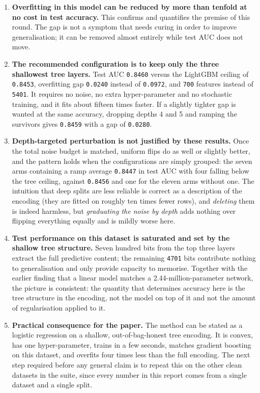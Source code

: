 \documentclass[11pt,a4paper]{article}
\newcommand{\num}[1]{\texttt{#1}}
\begin{document}
\begin{enumerate}

\item \textbf{Overfitting in this model can be reduced by more than tenfold at
no cost in test accuracy.} This confirms and quantifies the premise of this
round. The gap is not a symptom that needs curing in order to improve
generalisation; it can be removed almost entirely while test AUC does not move.

\item \textbf{The recommended configuration is to keep only the three
shallowest tree layers.} Test AUC \num{0.8460} versus the LightGBM ceiling of
\num{0.8453}, overfitting gap \num{0.0240} instead of \num{0.0972}, and
\num{700} features instead of \num{5401}. It requires no noise, no extra
hyper-parameter and no stochastic training, and it fits about fifteen times
faster. If a slightly tighter gap is wanted at the same accuracy, dropping
depths 4 and 5 and ramping the survivors gives \num{0.8459} with a gap of
\num{0.0280}.

\item \textbf{Depth-targeted perturbation is not justified by these results.}
Once the total noise budget is matched, uniform flips do as well or slightly
better, and the pattern holds when the configurations are simply grouped: the
seven arms containing a ramp average \num{0.8447} in test AUC with four falling
below the tree ceiling, against \num{0.8456} and one for the eleven arms
without one. The intuition that deep splits are less reliable is correct as a
description of the encoding (they are fitted on roughly ten times fewer rows),
and \emph{deleting} them is indeed harmless, but \emph{graduating the noise by
depth} adds nothing over flipping everything equally and is mildly worse here.

\item \textbf{Test performance on this dataset is saturated and set by the
shallow tree structure.} Seven hundred bits from the top three layers extract
the full predictive content; the remaining \num{4701} bits contribute nothing to
generalisation and only provide capacity to memorise. Together with the earlier
finding that a linear model matches a 2.44-million-parameter network, the
picture is consistent: the quantity that determines accuracy here is the tree
structure in the encoding, not the model on top of it and not the amount of
regularisation applied to it.

\item \textbf{Practical consequence for the paper.} The method can be stated as
a logistic regression on a shallow, out-of-bag-honest tree encoding. It is
convex, has one hyper-parameter, trains in a few seconds, matches gradient
boosting on this dataset, and overfits four times less than the full encoding.
The next step required before any general claim is to repeat this on the other
clean datasets in the suite, since every number in this report comes from a
single dataset and a single split.

\end{enumerate}
\end{document}
